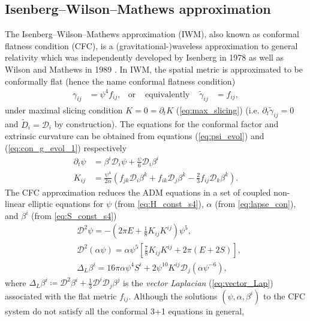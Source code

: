 \subsection{Isenberg–Wilson–Mathews approximation}  %
\label{section1.5.1}
The Isenberg–Wilson–Mathews approximation (IWM), also known as conformal flatness condition (CFC),
is a (gravitational-)waveless approximation to general relativity which was independently developed by
Isenberg in 1978 \cite{isenberg2008waveless} as well as Wilson and Mathews in 1989 \cite{wilson1989relativistic}.
In IWM, the spatial metric is approximated to be conformally flat (hence the name conformal flatness condition)
\begin{align}
    \gamma_{ij} &= \psi^4 f_{ij}, &\text{or } &\text{equivalently } & \tilde{\gamma}_{ij} &= f_{ij},
\end{align}
under maximal slicing condition $K=0=\partial_t K$ (\cref{eq:max_slicing})
(i.e. $\partial_t \tilde{\gamma}_{ij} = 0$ and $\tilde{D}_i=\mathcal{D}_i$ by construction).
The equations for the conformal factor and extrinsic curvature can be obtained from equations (\ref{eq:psi_evol}) and (\ref{eq:con_g_evol_1}) respectively
\begin{align}
    \partial_t \psi &= \beta^i \mathcal{D}_i \psi + \frac{\psi}{6} \mathcal{D}_i \beta^i \\
    K_{ij} &= \frac{\psi^4}{2\alpha} \left(f_{jk} \mathcal{D}_i \beta^k + f_{ik} \mathcal{D}_j \beta^k - \frac{2}{3} f_{ij} \mathcal{D}_k \beta^k \right) 
    \label{eq:K_CFC}.
\end{align}
The CFC approximation reduces the ADM equations in a set of coupled non-linear elliptic equations for $\psi$ (from \cref{eq:H_const_s4}), $\alpha$ (from \cref{eq:lapse_con}), and $\beta^i$ (from \cref{eq:S_const_s4})
\begin{align}
    & \mathcal{D}^2 \psi = - \left( 2\pi E + \frac{1}{8}K_{ij} K^{ij} \right) \psi^5, \\
    & \mathcal{D}^2 \left(\alpha \psi \right) = \alpha \psi^5 \left[ \frac{7}{8} K_{ij} K^{ij} + 2 \pi \left(E + 2 S \right) \right], \\
    & \Delta_L \beta^i = 16 \pi \alpha \psi^4 S^i + 2 \psi^{10} K^{ij} \mathcal{D}_j \left(\alpha \psi^{-6} \right),
\end{align}
where $\Delta_L \beta^i \coloneqq \mathcal{D}^2 \beta^i + \frac{1}{3} \mathcal{D}^i \mathcal{D}_j \beta^j$
is the \textit{vector Laplacian} (\cref{eq:vector_Lap}) associated with the flat metric $f_{ij}$.
Although the solutions $(\psi, \alpha, \beta^i)$ to the CFC system do not satisfy all the conformal 3+1 equations in general,
